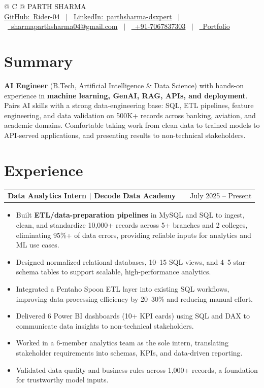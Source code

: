 \documentclass[a4paper,10pt]{article}
\makeatletter
\newcommand{\faGithub}{GitHub:}\newcommand{\faLinkedin}{LinkedIn:}\newcommand{\faEnvelope}{}%
\newcommand{\faMobile}{}\newcommand{\faGlobe}{}}
\newenvironment{joblong}[2]
    {
    \begin{tabularx}{\linewidth}{@{}l X r@{}}
    \textbf{#1} & \hfill &  #2 \\[2pt]
    \end{tabularx}
    \begin{minipage}[t]{\linewidth}
    \begin{itemize}[nosep,after=\strut, leftmargin=1em, itemsep=1pt,label=--]
    }
    {
    \end{itemize}
    \end{minipage}
    }
\makeatother
\begin{document}
\pagestyle{empty}

\begin{tabularx}{\linewidth}{@{} C @{}}
\Huge{PARTH SHARMA} \\[5pt]
\href{https://github.com/Rider-04}{\raisebox{-0.05\height}\faGithub\ Rider-04} \ $|$ \
\href{https://www.linkedin.com/in/parthsharma-dsxpert}{\raisebox{-0.05\height}\faLinkedin\ parthsharma-dsxpert} \ $|$ \
\href{mailto:sharmaparthsharma04@gmail.com}{\raisebox{-0.05\height}\faEnvelope \ sharmaparthsharma04@gmail.com} \ $|$ \
\href{tel:+917067837303}{\raisebox{-0.05\height}\faMobile \ +91-7067837303} \ $|$ \
\href{https://parth-portfolio-virid.vercel.app/}{\raisebox{-0.05\height}\faGlobe \ Portfolio}
\end{tabularx}

\section{Summary}
\textbf{AI Engineer} (B.Tech, Artificial Intelligence \& Data Science) with hands-on experience in \textbf{machine learning, GenAI, RAG, APIs, and deployment}. Pairs AI skills with a strong data-engineering base: SQL, ETL pipelines, feature engineering, and data validation on 500K+ records across banking, aviation, and academic domains. Comfortable taking work from clean data to trained models to API-served applications, and presenting results to non-technical stakeholders.

\section{Experience}
\begin{joblong}{Data Analytics Intern | Decode Data Academy}{July 2025 -- Present}
\item Built \textbf{ETL/data-preparation pipelines} in MySQL and SQL to ingest, clean, and standardize 10,000+ records across 5+ branches and 2 colleges, eliminating 95\%+ of data errors, providing reliable inputs for analytics and ML use cases.
\item Designed normalized relational databases, 10--15 SQL views, and 4--5 star-schema tables to support scalable, high-performance analytics.
\item Integrated a Pentaho Spoon ETL layer into existing SQL workflows, improving data-processing efficiency by 20--30\% and reducing manual effort.
\item Delivered 6 Power BI dashboards (10+ KPI cards) using SQL and DAX to communicate data insights to non-technical stakeholders.
\item Worked in a 6-member analytics team as the sole intern, translating stakeholder requirements into schemas, KPIs, and data-driven reporting.
\item Validated data quality and business rules across 1,000+ records, a foundation for trustworthy model inputs.
\end{joblong}
\end{document}
